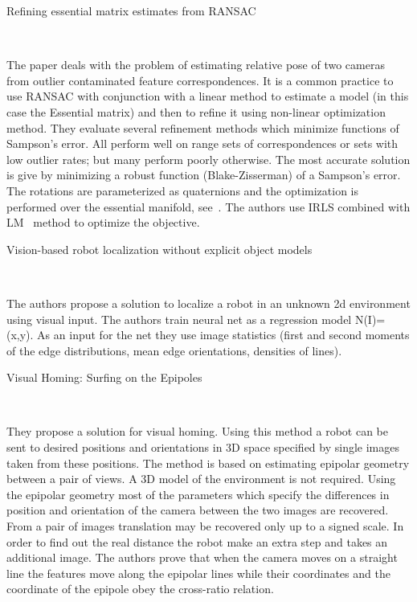 \documentclass[10pt]{article}         %
\begin{document}
\begin{enumerate}
  {\Large \item Refining essential matrix estimates from
    RANSAC}~\cite{botterillrefining}

  The paper deals with the problem of estimating relative pose of two
  cameras from outlier contaminated feature correspondences.  It is a
  common practice to use RANSAC with conjunction with a linear method
  to estimate a model (in this case the Essential matrix) and then to
  refine it using non-linear optimization method. They evaluate
  several refinement methods which minimize functions of Sampson's
  error.  All perform well on range sets of correspondences or sets
  with low outlier rates; but many perform poorly otherwise.  The most
  accurate solution is give by minimizing a robust function
  (Blake-Zisserman) of a Sampson's error.  The rotations are
  parameterized as quaternions and the optimization is performed over
  the essential manifold, see~\cite{schmidt2001using}.  The authors
  use IRLS combined with LM~\cite{marquardt1963algorithm} method to
  optimize the objective.

  {\Large \item Vision-based robot localization without explicit
    object models}~\cite{dudek1996vision}

  The authors propose a solution to localize a robot in an unknown 2d
  environment using visual input. The authors train neural net as a
  regression model N(I)=(x,y).  As an input for the net they use image
  statistics (first and second moments of the edge distributions, mean
  edge orientations, densities of lines).

  {\Large \item Visual Homing: Surfing on the Epipoles}~\cite{basri1999visual}

  They propose a solution for visual homing.  Using this method a
  robot can be sent to desired positions and orientations in 3D space
  specified by single images taken from these positions.  The method
  is based on estimating epipolar geometry between a pair of views. A
  3D model of the environment is not required.  Using the epipolar
  geometry most of the parameters which specify the differences in
  position and orientation of the camera between the two images are
  recovered.  From a pair of images translation may be recovered only
  up to a signed scale.  In order to find out the real distance the
  robot make an extra step and takes an additional image.  The authors
  prove that when the camera moves on a straight line the features
  move along the epipolar lines while their coordinates and the
  coordinate of the epipole obey the cross-ratio relation.


\end{enumerate}
\end{document}
